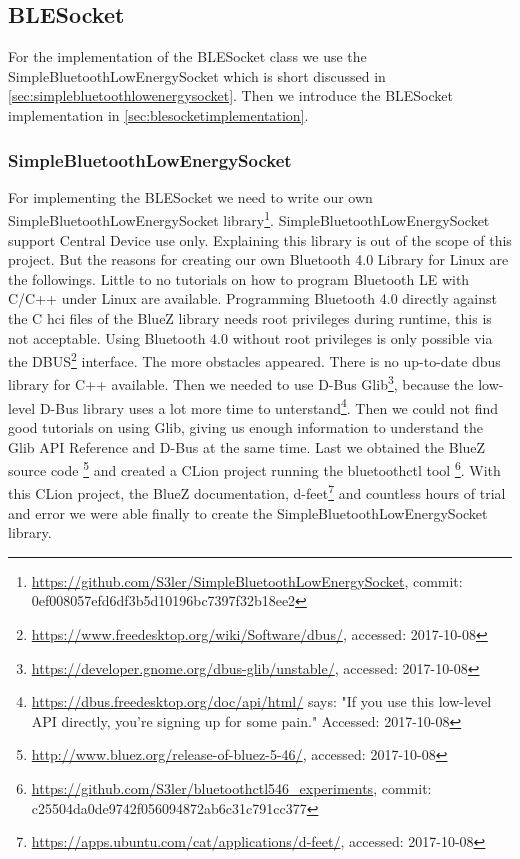 \subsection{BLESocket}\label{sec:blesocket}
For the implementation of the BLESocket class we use the SimpleBluetoothLowEnergySocket which is short discussed in \autoref{sec:simplebluetoothlowenergysocket}. Then we introduce the BLESocket implementation in \autoref{sec:blesocketimplementation}.
\subsubsection{SimpleBluetoothLowEnergySocket}\label{sec:simplebluetoothlowenergysocket}
For implementing the BLESocket we need to write our own SimpleBluetoothLowEnergySocket library\footnote{\url{https://github.com/S3ler/SimpleBluetoothLowEnergySocket}, commit: 0ef008057efd6df3b5d10196bc7397f32b18ee2}.
SimpleBluetoothLowEnergySocket support Central Device use only.
Explaining this library is out of the scope of this project.
But the reasons for creating our own Bluetooth 4.0 Library for Linux are the followings.
Little to no tutorials on how to program Bluetooth LE with C/C++ under Linux are available.
Programming Bluetooth 4.0 directly against the C hci files of the BlueZ library needs root privileges during runtime, this is not acceptable.
Using  Bluetooth 4.0 without root privileges is only possible via the DBUS\footnote{\url{https://www.freedesktop.org/wiki/Software/dbus/}, accessed: 2017-10-08} interface.
The more obstacles appeared.
There is no up-to-date dbus library for C++ available.
Then we needed to use D-Bus Glib\footnote{\url{https://developer.gnome.org/dbus-glib/unstable/}, accessed: 2017-10-08}, because the low-level D-Bus library uses a lot more time to unterstand\footnote{\url{https://dbus.freedesktop.org/doc/api/html/} says: "If you use this low-level API directly, you're signing up for some pain." Accessed: 2017-10-08}.
Then we could not find good tutorials on using Glib, giving us enough information to understand the Glib API Reference and D-Bus at the same time.
Last we obtained the BlueZ source code
\footnote{\url{http://www.bluez.org/release-of-bluez-5-46/}, accessed: 2017-10-08}
 and created a CLion project running the bluetoothctl tool
\footnote{\url{https://github.com/S3ler/bluetoothctl546_experiments}, commit: c25504da0de9742f056094872ab6c31c791cc377}.
With this CLion project, the BlueZ documentation, d-feet\footnote{\url{https://apps.ubuntu.com/cat/applications/d-feet/}, accessed: 2017-10-08} and countless hours of trial and error we were able finally to create the SimpleBluetoothLowEnergySocket library.
